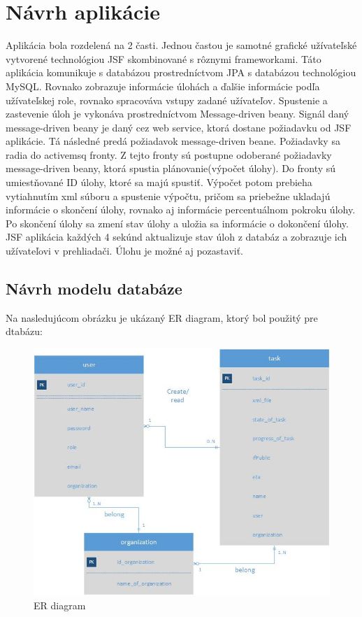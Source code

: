 \section{Návrh aplikácie}
Aplikácia bola rozdelená na 2 časti. Jednou častou je samotné grafické užívateľské vytvorené technológiou JSF skombinované s rôznymi frameworkami. Táto aplikácia komunikuje s databázou prostredníctvom JPA s databázou technológiou MySQL. Rovnako zobrazuje informácie úlohách a ďalšie informácie podľa užívateľskej role, rovnako spracováva vstupy zadané užívateľov. Spustenie a zastevenie úloh je vykonáva prostredníctvom Message-driven beany. Signál daný message-driven beany je daný cez web service, ktorá dostane požiadavku od JSF aplikácie. Tá následné predá požiadavok message-driven beane. Požiadavky sa radia do activemsq fronty. Z tejto fronty sú postupne odoberané požiadavky message-driven beany, ktorá spustia plánovanie(výpočet úlohy). Do fronty sú umiestňované ID úlohy, ktoré sa majú spustiť. Výpočet potom prebieha vytiahnutím xml súboru a spustenie výpočtu, pričom sa priebežne ukladajú informácie o skončení úlohy, rovnako aj informácie percentuálnom pokroku úlohy. Po skončení úlohy sa zmení stav úlohy a uložia sa informácie o dokončení úlohy. JSF aplikácia každých 4 sekúnd aktualizuje stav úloh z databáz a zobrazuje ich užívateľovi v prehliadači. Úlohu je možné aj pozastaviť. 





\subsection{Návrh modelu databáze}
Na nasledujúcom obrázku je ukázaný ER diagram, ktorý bol použitý pre dtabázu:
\begin{figure}[htb]

\begin{center}

\includegraphics[scale=0.5]{ER.jpg} 
\caption{ER diagram}
\label{ER}

\end{center}

\end{figure}

